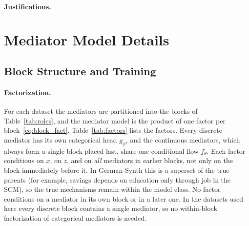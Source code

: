 \paragraph{Justifications.}

\section{Mediator Model Details}
\label{app:training}

\subsection{Block Structure and Training}
\label{app:block_training}

\paragraph{Factorization.}
For each dataset the mediators are partitioned into the blocks of
Table~\ref{tab:roles}, and the mediator model is the product of one factor
per block~\eqref{eq:block_fact}. Table~\ref{tab:factors} lists the factors.
Every discrete mediator has its own categorical head $g_\phi$, and the
continuous mediators, which always form a single block placed last, share
one conditional flow $f_\theta$. Each factor conditions on $x$, on $z$, and on
\emph{all} mediators in earlier blocks, not only on the block immediately
before it. In German-Synth this is a superset of the true parents (for
example, savings depends on education only through job in the SCM), so the
true mechanisms remain within the model class. No factor conditions on a
mediator in its own block or in a later one. In the datasets used here every
discrete block contains a single mediator, so no within-block factorization of
categorical mediators is needed.

